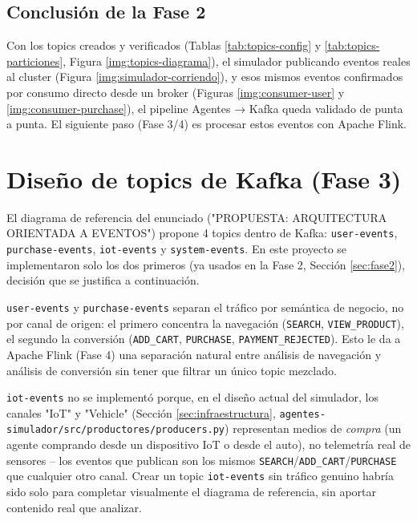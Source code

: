 \subsection{Conclusión de la Fase 2}

Con los topics creados y verificados (Tablas \ref{tab:topics-config} y \ref{tab:topics-particiones}, Figura \ref{img:topics-diagrama}), el simulador publicando eventos reales al cluster (Figura \ref{img:simulador-corriendo}), y esos mismos eventos confirmados por consumo directo desde un broker (Figuras \ref{img:consumer-user} y \ref{img:consumer-purchase}), el pipeline Agentes → Kafka queda validado de punta a punta. El siguiente paso (Fase 3/4) es procesar estos eventos con Apache Flink.

\clearpage
\section{Diseño de topics de Kafka (Fase 3)}
\label{sec:kafka-topics}

El diagrama de referencia del enunciado ("PROPUESTA: ARQUITECTURA ORIENTADA A EVENTOS") propone 4 topics dentro de Kafka: \texttt{user-events}, \texttt{purchase-events}, \texttt{iot-events} y \texttt{system-events}. En este proyecto se implementaron solo los dos primeros (ya usados en la Fase 2, Sección \ref{sec:fase2}), decisión que se justifica a continuación.

\texttt{user-events} y \texttt{purchase-events} separan el tráfico por semántica de negocio, no por canal de origen: el primero concentra la navegación (\texttt{SEARCH}, \texttt{VIEW\_PRODUCT}), el segundo la conversión (\texttt{ADD\_CART}, \texttt{PURCHASE}, \texttt{PAYMENT\_REJECTED}). Esto le da a Apache Flink (Fase 4) una separación natural entre análisis de navegación y análisis de conversión sin tener que filtrar un único topic mezclado.

\texttt{iot-events} no se implementó porque, en el diseño actual del simulador, los canales "IoT" y "Vehicle" (Sección \ref{sec:infraestructura}, \texttt{agentes-simulador/src/productores/producers.py}) representan medios de \textit{compra} (un agente comprando desde un dispositivo IoT o desde el auto), no telemetría real de sensores -- los eventos que publican son los mismos \texttt{SEARCH}/\texttt{ADD\_CART}/\texttt{PURCHASE} que cualquier otro canal. Crear un topic \texttt{iot-events} sin tráfico genuino habría sido solo para completar visualmente el diagrama de referencia, sin aportar contenido real que analizar.

